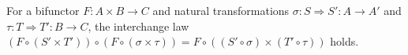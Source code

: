 For a bifunctor $F: A \times B \to C$ and natural transformations $\sigma: S \Rightarrow S': A \to A'$ and $\tau: T \Rightarrow T': B \to C$, the interchange law $(F \circ (S' \times T')) \circ (F \circ (\sigma \times \tau)) = F \circ ((S' \circ \sigma) \times (T' \circ \tau))$ holds.
